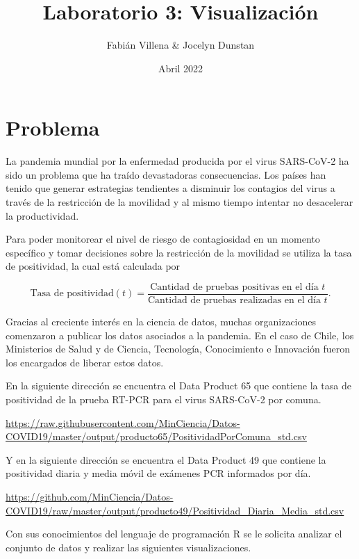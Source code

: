 \documentclass{article}
\title{Laboratorio 3: Visualización}
\author{Fabián Villena \& Jocelyn Dunstan}
\date{Abril 2022}
\begin{document}
\maketitle

\section{Problema}

La pandemia mundial por la enfermedad producida por el virus SARS-CoV-2 ha sido un problema que ha traído devastadoras consecuencias. Los países han tenido que generar estrategias tendientes a disminuir los contagios del virus a través de la restricción de la movilidad y al mismo tiempo intentar no desacelerar la productividad.

Para poder monitorear el nivel de riesgo de contagiosidad en un momento específico y tomar decisiones sobre la restricción de la movilidad se utiliza la tasa de positividad, la cual está calculada por 

\begin{equation}
\textrm{Tasa de positividad}(t) = \frac{\textrm{Cantidad de pruebas positivas en el día } t}{\textrm{Cantidad de pruebas realizadas en el día } t}.
\end{equation}

Gracias al creciente interés en la ciencia de datos, muchas organizaciones comenzaron a publicar los datos asociados a la pandemia. En el caso de Chile, los Ministerios de Salud y de Ciencia, Tecnología, Conocimiento e Innovación fueron los encargados de liberar estos datos.

En la siguiente dirección se encuentra el Data Product 65 que contiene la tasa de positividad de la prueba RT-PCR para el virus SARS-CoV-2 por comuna.

\begin{center}
    \url{https://raw.githubusercontent.com/MinCiencia/Datos-COVID19/master/output/producto65/PositividadPorComuna_std.csv}
\end{center}

Y en la siguiente dirección se encuentra el Data Product 49 que contiene la positividad diaria y media móvil de exámenes PCR informados por día.

\begin{center}
    \url{https://github.com/MinCiencia/Datos-COVID19/raw/master/output/producto49/Positividad_Diaria_Media_std.csv}
\end{center}

Con sus conocimientos del lenguaje de programación R se le solicita analizar el conjunto de datos y realizar las siguientes visualizaciones.
\end{document}

